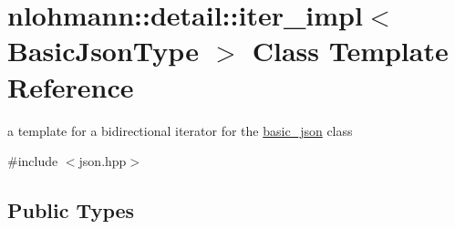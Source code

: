 \hypertarget{classnlohmann_1_1detail_1_1iter__impl}{}\section{nlohmann\+:\+:detail\+:\+:iter\+\_\+impl$<$ Basic\+Json\+Type $>$ Class Template Reference}
\label{classnlohmann_1_1detail_1_1iter__impl}


a template for a bidirectional iterator for the \mbox{\hyperlink{classnlohmann_1_1basic__json}{basic\+\_\+json}} class  




{\ttfamily \#include $<$json.\+hpp$>$}

\subsection*{Public Types}
